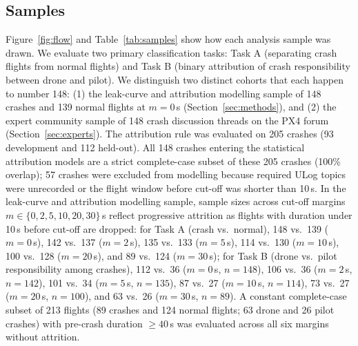 \documentclass[preprint,12pt]{elsarticle}
\begin{document}
\subsection{Samples}
Figure~\ref{fig:flow} and Table~\ref{tab:samples} show how each analysis sample was drawn. We evaluate two primary classification tasks: Task A (separating crash flights from normal flights) and Task B (binary attribution of crash responsibility between drone and pilot). We distinguish two distinct
cohorts that each happen to number 148: (1) the leak-curve and attribution modelling sample of 148 crashes and 139 normal
flights at $m=0$\,s (Section~\ref{sec:methods}), and (2) the expert community sample of 148 crash discussion threads on the
PX4 forum (Section~\ref{sec:experts}). The attribution rule was evaluated on 205 crashes (93 development and 112 held-out).
All 148 crashes entering the statistical attribution models are a strict complete-case subset of these 205 crashes (100\%
overlap); 57 crashes were excluded from modelling because required ULog topics were unrecorded or the flight window before
cut-off was shorter than 10\,s. In the leak-curve and attribution modelling sample, sample sizes across cut-off margins
$m \in \{0, 2, 5, 10, 20, 30\}$\,s reflect progressive attrition as flights with duration under 10\,s before cut-off are dropped:
for Task A (crash vs.\ normal), 148 vs.\ 139 ($m=0$\,s), 142 vs.\ 137 ($m=2$\,s), 135 vs.\ 133 ($m=5$\,s), 114 vs.\ 130
($m=10$\,s), 100 vs.\ 128 ($m=20$\,s), and 89 vs.\ 124 ($m=30$\,s); for Task B (drone vs.\ pilot responsibility among crashes),
112 vs.\ 36 ($m=0$\,s, $n=148$), 106 vs.\ 36 ($m=2$\,s, $n=142$), 101 vs.\ 34 ($m=5$\,s, $n=135$), 87 vs.\ 27 ($m=10$\,s,
$n=114$), 73 vs.\ 27 ($m=20$\,s, $n=100$), and 63 vs.\ 26 ($m=30$\,s, $n=89$). A constant complete-case subset of 213 flights
(89 crashes and 124 normal flights; 63 drone and 26 pilot crashes) with pre-crash duration $\ge 40$\,s was evaluated across
all six margins without attrition.
\end{document}
